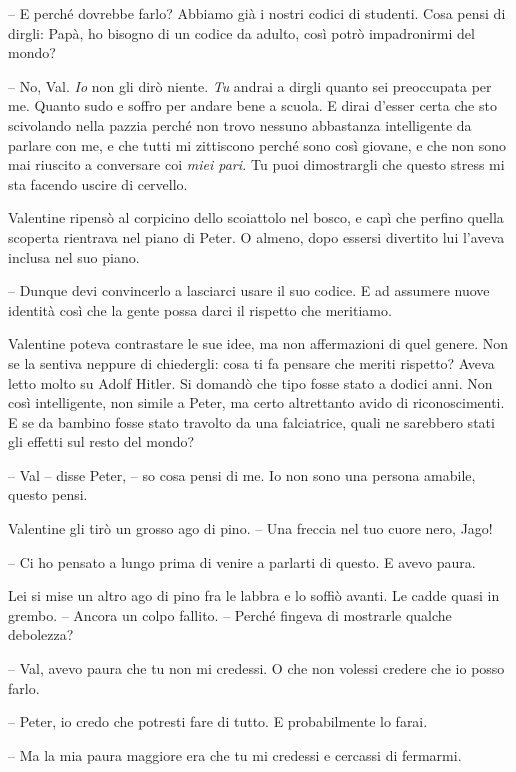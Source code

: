 {-- E perché dovrebbe farlo? Abbiamo già i nostri codici di studenti.
	Cosa pensi di dirgli: Papà, ho bisogno di un codice da adulto, così
	potrò impadronirmi del mondo?}

{-- No, Val. \emph{Io} non gli dirò niente. \emph{Tu} andrai a dirgli
	quanto sei preoccupata per me. Quanto sudo e soffro per andare bene a
	scuola. E dirai d'esser certa che sto scivolando nella pazzia perché non
	trovo nessuno abbastanza intelligente da parlare con me, e che tutti mi
	zittiscono perché sono così giovane, e che non sono mai riuscito a
	conversare coi \emph{miei pari.} Tu puoi dimostrargli che questo stress
	mi sta facendo uscire di cervello.}

{Valentine ripensò al corpicino dello scoiattolo nel bosco, e capì che
	perfino quella scoperta rientrava nel piano di Peter. O almeno, dopo
	essersi divertito lui l'aveva inclusa nel suo piano.}

{-- Dunque devi convincerlo a lasciarci usare il suo codice. E ad
	assumere nuove identità così che la gente possa darci il rispetto che
	meritiamo.}

{Valentine poteva contrastare le sue idee, ma non affermazioni di quel
	genere. Non se la sentiva neppure di chiedergli: cosa ti fa pensare che
	meriti rispetto? Aveva letto molto su Adolf Hitler. Si domandò che tipo
	fosse stato a dodici anni. Non così intelligente, non simile a Peter, ma
	certo altrettanto avido di riconoscimenti. E se da bambino fosse stato
	travolto da una falciatrice, quali ne sarebbero stati gli effetti sul
	resto del mondo?}

{-- Val -- disse Peter, -- so cosa pensi di me. Io non sono una persona
	amabile, questo pensi.}

{Valentine gli tirò un grosso ago di pino. -- Una freccia nel tuo cuore
	nero, Jago!}

{-- Ci ho pensato a lungo prima di venire a parlarti di questo. E avevo
	paura.}

{Lei si mise un altro ago di pino fra le labbra e lo soffiò avanti. Le
	cadde quasi in grembo. -- Ancora un colpo fallito. -- Perché fingeva di
	mostrarle qualche debolezza?}

{-- Val, avevo paura che tu non mi credessi. O che non volessi credere
	che io posso farlo.}

{-- Peter, io credo che potresti fare di tutto. E probabilmente lo
	farai.}

{-- Ma la mia paura maggiore era che tu mi credessi e cercassi di
	fermarmi.}

